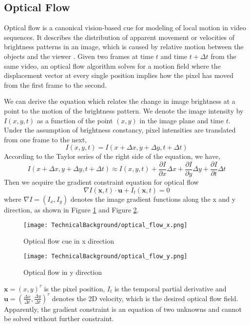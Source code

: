 \subsection{Optical Flow}
Optical flow is a canonical vision-based cue for modeling of local motion in video sequences.
It describes the distribution of apparent movement or velocities of brightness patterns in
an image, which is caused by relative motion between the objects and the viewer \cite{Horn81determiningoptical}. Given two frames at time $t$ and time $t + \Delta t$ from the same video, an optical flow algorithm solves for a motion field where the displacement vector at every single position implies how the pixel has moved from the first frame to the second. 

We can derive the equation which relates the change in image brightness at a point to the
motion of the brightness pattern. We denote the image intensity by $I(x, y, t)$ as a function of the point $(x, y)$ in the image plane and time $t$. Under the assumption of brightness constancy, pixel intensities are translated from one frame to the next,
\begin{equation}
I(x, y, t) = I(x + \Delta x, y + \Delta y, t + \Delta t)
\end{equation}
According to the Taylor series of the right side of the equation, we have,
\begin{equation}
I(x + \Delta x, y + \Delta y, t + \Delta t) \approx I(x, y, t) + \frac{\partial I}{\partial x}\Delta x + \frac{\partial I}{\partial y}\Delta y + \frac{\partial I}{\partial t}\Delta t
\end{equation}
Then we acquire the gradient constraint equation for optical flow
\begin{equation}
\nabla I(\mathbf{x}, t)\cdot \mathbf{u} + I_{t}(\mathbf{x}, t) = 0
\end{equation}
where $\nabla I = (I_{x}, I_{y})$ denotes the image gradient functions along the x and y direction, as shown in Figure \ref{fig:opflow_cue_x} and Figure \ref{fig:opflow_cue_y}. 

\begin{figure}[h!]
  \centering
  \texttt{[image: TechnicalBackground/optical\_flow\_x.png]}
  \caption{Optical flow cue in x direction}
  \label{fig:opflow_cue_x}
\end{figure}
\begin{figure}[h!]  
  \texttt{[image: TechnicalBackground/optical\_flow\_y.png]}
  \caption{Optical flow in y direction}
  \label{fig:opflow_cue_y}
\end{figure}
$\mathbf{x} = (x, y)^{\tau}$ is the pixel position, $I_{t}$ is the temporal partial derivative and 
$\mathbf{u} = (\frac{\Delta x}{\Delta t}, \frac{\Delta y}{\Delta t})^{\tau}$ denotes the 2D velocity, which is the desired optical flow field. Apparently, the gradient constraint is an equation of two unknowns and cannot be solved without further constraint.

